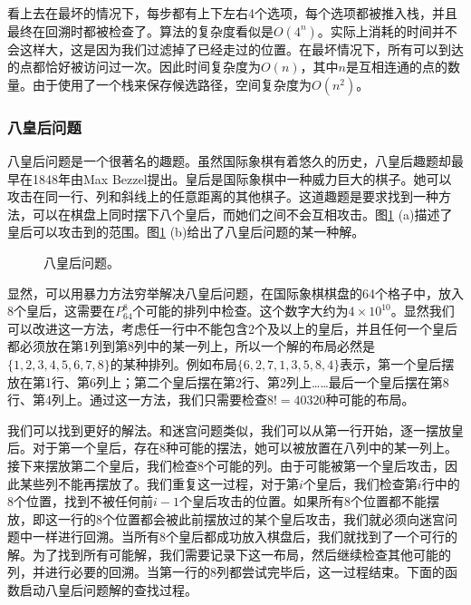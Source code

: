 \documentclass[UTF8]{article}
\begin{document}
看上去在最坏的情况下，每步都有上下左右4个选项，每个选项都被推入栈，并且最终在回溯时都被检查了。算法的复杂度看似是$O(4^n)$。实际上消耗的时间并不会这样大，这是因为我们过滤掉了已经走过的位置。在最坏情况下，所有可以到达的点都恰好被访问过一次。因此时间复杂度为$O(n)$，其中$n$是互相连通的点的数量。由于使用了一个栈来保存候选路径，空间复杂度为$O(n^2)$。

\subsubsection{八皇后问题}

八皇后问题是一个很著名的趣题。虽然国际象棋有着悠久的历史，八皇后趣题却最早在1848年由Max Bezzel提出\cite{wiki-8-queens}。皇后是国际象棋中一种威力巨大的棋子。她可以攻击在同一行、列和斜线上的任意距离的其他棋子。这道趣题是要求找到一种方法，可以在棋盘上同时摆下八个皇后，而她们之间不会互相攻击。图\ref{fig:8-queens-puzzle} (a)描述了皇后可以攻击到的范围。图\ref{fig:8-queens-puzzle} (b)给出了八皇后问题的某一种解。

\begin{figure}[htbp]
 \centering
 \caption{八皇后问题。}
 \label{fig:8-queens-puzzle}
\end{figure}

显然，可以用暴力方法穷举解决八皇后问题，在国际象棋棋盘的64个格子中，放入8个皇后，这需要在$P^8_{64}$个可能的排列中检查。这个数字大约为$4 \times 10^{10}$。显然我们可以改进这一方法，考虑任一行中不能包含2个及以上的皇后，并且任何一个皇后都必须放在第1列到第8列中的某一列上，所以一个解的布局必然是$\{1,2,3,4,5,6,7,8\}$的某种排列。例如布局$\{6,2,7,1,3,5,8,4\}$表示，第一个皇后摆放在第1行、第6列上；第二个皇后摆在第2行、第2列上……最后一个皇后摆在第8行、第4列上。通过这一方法，我们只需要检查$8! = 40320$种可能的布局。

我们可以找到更好的解法。和迷宫问题类似，我们可以从第一行开始，逐一摆放皇后。对于第一个皇后，存在8种可能的摆法，她可以被放置在八列中的某一列上。接下来摆放第二个皇后，我们检查8个可能的列。由于可能被第一个皇后攻击，因此某些列不能再摆放了。我们重复这一过程，对于第$i$个皇后，我们检查第$i$行中的8个位置，找到不被任何前$i-1$个皇后攻击的位置。如果所有8个位置都不能摆放，即这一行的8个位置都会被此前摆放过的某个皇后攻击，我们就必须向迷宫问题中一样进行回溯。当所有8个皇后都成功放入棋盘后，我们就找到了一个可行的解。为了找到所有可能解，我们需要记录下这一布局，然后继续检查其他可能的列，并进行必要的回溯。当第一行的8列都尝试完毕后，这一过程结束。下面的函数启动八皇后问题解的查找过程。
\end{document}
